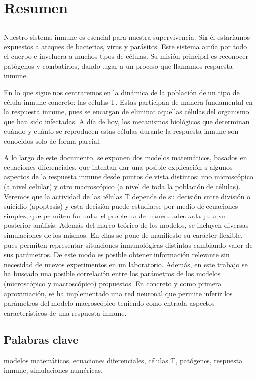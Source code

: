 \chapter*{Resumen}


\section*{}

Nuestro sistema inmune es esencial para nuestra supervivencia. Sin él estaríamos expuestos a ataques de bacterias, virus y parásitos. Este sistema actúa por todo el cuerpo e involucra a muchos tipos de células. Su misión principal es reconocer patógenos y combatirlos, dando lugar a un proceso que llamamos respuesta inmune. 

En lo que sigue nos centraremos en la dinámica de la población de un tipo de célula inmune concreto: las células T. Estas participan de manera fundamental en la respuesta inmune, pues se encargan de eliminar aquellas células del organismo que han sido infectadas. A día de hoy, los mecanismos biológicos que determinan cuándo y cuánto se reproducen estas células durante la respuesta inmune son conocidos solo de forma parcial. 

A lo largo de este documento, se exponen dos modelos matemáticos, basados en ecuaciones diferenciales, que intentan dar una posible explicación a algunos aspectos de la respuesta inmune desde puntos de vista distintos: uno microscópico (a nivel celular) y otro macroscópico (a nivel de toda la población de células). Veremos que la actividad de las células T depende de su decisión entre división o suicidio (apoptosis) y esta decisión puede estudiarse por medio de ecuaciones simples, que permiten formular el problema de manera adecuada para su posterior análisis. Además del marco teórico de los modelos, se incluyen diversas simulaciones de los mismos. En ellas se pone de manifiesto su carácter flexible, pues permiten representar situaciones inmunológicas distintas cambiando valor de sus parámetros. De este modo es posible obtener información relevante sin necesidad de nuevos experimentos en un laboratorio. Además, en este trabajo se ha buscado una posible correlación entre los parámetros de los modelos (microscópico y macroscópico) propuestos. En concreto y como primera aproximación, se ha implementado una red neuronal que permite inferir los parámetros del modelo macroscópico teniendo como entrada aspectos característicos de una respuesta inmune.



\section*{Palabras clave}
   

\noindent modelos matemáticos, ecuaciones diferenciales, células T, patógenos, respuesta inmune, simulaciones numéricas.

   


